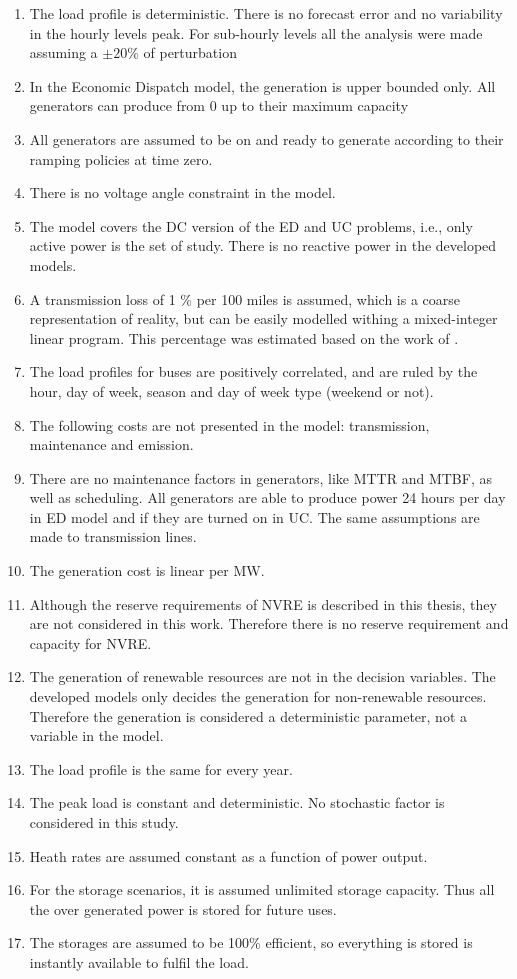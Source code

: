 \documentclass[12pt,LUDisStyle,twosided]{book}
\begin{document}
\begin{enumerate}
\item The load profile is deterministic. There is no forecast error and no variability in the hourly levels peak. For sub-hourly levels all the analysis were made assuming a $\pm20\%$ of perturbation
\item In the Economic Dispatch model, the generation is upper bounded only. All generators can produce from 0 up to their maximum capacity
\item All generators are assumed to be on and ready to generate according to their ramping policies at time zero.
\item There is no voltage angle constraint in the model.
\item The model covers the DC version of the ED and UC problems, i.e., only active power is the set of study. There is no reactive power in the developed models.
\item A transmission loss of 1 \% per 100 miles is assumed, which is a coarse representation of reality, but can be easily modelled withing a mixed-integer linear program. This percentage was estimated based on the work of \citeauthor{short} \cite{short}.
\item The load profiles for buses are positively correlated, and are ruled by the hour, day of week, season and day of week type (weekend or not).
\item The following costs are not presented in the model: transmission, maintenance and emission.
\item There are no maintenance factors in generators, like MTTR and MTBF, as well as scheduling. All generators are able to produce power 24 hours per day in ED model and if they are turned on in UC. The same assumptions are made to transmission lines.
\item The generation cost is linear per MW.
\item Although the reserve requirements of NVRE is described in this thesis, they are not considered in this work. Therefore there is no reserve requirement and capacity for NVRE.
\item The generation of renewable resources are not in the decision variables. The developed models only decides the generation for non-renewable resources. Therefore the generation is considered a deterministic parameter, not a variable in the model.
\item The load profile is the same for every year.
\item The peak load is constant and deterministic. No stochastic factor is considered in this study.
\item Heath rates are assumed constant as a function of power output.
\item For the storage scenarios, it is assumed unlimited storage capacity. Thus all the over generated power is stored for future uses.
\item The storages are assumed to be 100\% efficient, so everything is stored is instantly available to fulfil the load.
\end{enumerate}
\end{document}
